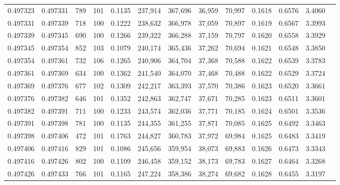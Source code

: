\begin{tabular}{rrrrrrrrrrrrr}
0.497323 & 0.497331 &   789 & 101 &                                     0.1135 & 237,914 & 367,696 &  36,959 &  70,997 & 0.1618 & 0.6576 & 3.4060 \\
0.497331 & 0.497339 &   718 & 100 &                                     0.1222 & 238,632 & 366,978 &  37,059 &  70,897 & 0.1619 & 0.6567 & 3.3993 \\
0.497339 & 0.497345 &   690 & 100 &                                     0.1266 & 239,322 & 366,288 &  37,159 &  70,797 & 0.1620 & 0.6558 & 3.3929 \\
0.497345 & 0.497354 &   852 & 103 &                                     0.1079 & 240,174 & 365,436 &  37,262 &  70,694 & 0.1621 & 0.6548 & 3.3850 \\
0.497354 & 0.497361 &   732 & 106 &                                     0.1265 & 240,906 & 364,704 &  37,368 &  70,588 & 0.1622 & 0.6539 & 3.3783 \\
0.497361 & 0.497369 &   634 & 100 &                                     0.1362 & 241,540 & 364,070 &  37,468 &  70,488 & 0.1622 & 0.6529 & 3.3724 \\
0.497369 & 0.497376 &   677 & 102 &                                     0.1309 & 242,217 & 363,393 &  37,570 &  70,386 & 0.1623 & 0.6520 & 3.3661 \\
0.497376 & 0.497382 &   646 & 101 &                                     0.1352 & 242,863 & 362,747 &  37,671 &  70,285 & 0.1623 & 0.6511 & 3.3601 \\
0.497382 & 0.497391 &   711 & 100 &                                     0.1233 & 243,574 & 362,036 &  37,771 &  70,185 & 0.1624 & 0.6501 & 3.3536 \\
0.497391 & 0.497398 &   781 & 100 &                                     0.1135 & 244,355 & 361,255 &  37,871 &  70,085 & 0.1625 & 0.6492 & 3.3463 \\
0.497398 & 0.497406 &   472 & 101 &                                     0.1763 & 244,827 & 360,783 &  37,972 &  69,984 & 0.1625 & 0.6483 & 3.3419 \\
0.497406 & 0.497416 &   829 & 101 &                                     0.1086 & 245,656 & 359,954 &  38,073 &  69,883 & 0.1626 & 0.6473 & 3.3343 \\
0.497416 & 0.497426 &   802 & 100 &                                     0.1109 & 246,458 & 359,152 &  38,173 &  69,783 & 0.1627 & 0.6464 & 3.3268 \\
0.497426 & 0.497433 &   766 & 101 &                                     0.1165 & 247,224 & 358,386 &  38,274 &  69,682 & 0.1628 & 0.6455 & 3.3197 \\

\end{tabular}
